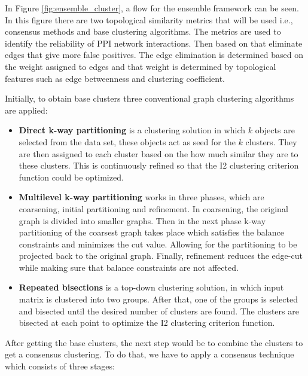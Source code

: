 In Figure \ref{fig:ensemble_cluster}, a flow for the ensemble framework can be seen. In  this figure 
there are two topological similarity metrics that will be used i.e., consensus methods 
and base clustering algorithms. The metrics are used to identify the reliability of PPI 
network interactions. Then based on that eliminate edges that give more false 
positives.\cite{wu_comprehensive_2020} The edge elimination is determined based on the 
weight assigned to edges and that weight is determined by topological features such as 
edge betweenness and clustering coefficient.

Initially, to obtain base clusters three conventional graph clustering algorithms are applied:
\begin{itemize}
    \item \textbf{Direct k-way partitioning} is a clustering solution in which $k$ objects are selected from the data set, these objects act as seed for the $k$ clusters. They are then assigned to each cluster based on the how much similar they are to these clusters. This is continuously refined so that the I2 clustering criterion function could be optimized.
    \item \textbf{Multilevel k-way partitioning} works in three phases, which are coarsening, initial partitioning and refinement. In coarsening, the original graph is divided into smaller graphs. Then in the next phase k-way partitioning of the coarsest graph takes place which satisfies the balance constraints and minimizes the cut value. Allowing for the partitioning to be projected back to the original graph. Finally, refinement reduces the edge-cut while making sure that balance constraints are not affected.  
    \item \textbf{Repeated bisections} is a top-down clustering solution, in which input matrix is clustered into two groups. After that, one of the groups is selected and bisected until the desired number of clusters are found. The clusters are bisected at each point to optimize the I2 clustering criterion function.
\end{itemize}

After getting the base clusters, the next step would be to combine the clusters to get a consensus clustering. To do that, we have to apply a consensus technique which consists of three stages:

